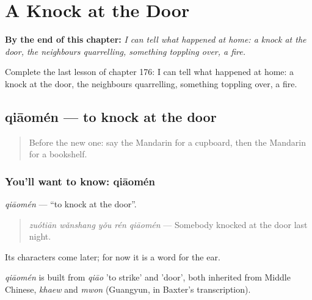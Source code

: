
\chapter{A Knock at the Door}
\label{ch:zh-a-knock-at-the-door}

\begin{chapteropening}
\textbf{By the end of this chapter:} \emph{I can tell what happened at home: a knock at the door, the neighbours quarrelling, something toppling over, a fire.}

Complete the last lesson of chapter 176: I can tell what happened at home: a knock at the door, the neighbours quarrelling, something toppling over, a fire.
\end{chapteropening}

\section[qiāomén]{qiāomén — to knock at the door}

\label{lesson:ZH-C176-qiaomen}



\begin{quote}
Before the new one: say the Mandarin for a cupboard, then the Mandarin for a bookshelf.
\end{quote}

\subsection*{You'll want to know: qiāomén}
\emph{qiāomén} — \textquotedblleft{}to knock at the door\textquotedblright{}.

\begin{quote}
\emph{zuótiān wǎnshang yǒu rén qiāomén} — Somebody knocked at the door last night.
\end{quote}

Its characters come later; for now it is a word for the ear.

\begin{cousinweb}
\emph{qiāomén} is built from \emph{qiāo} 'to strike' and  'door', both inherited from Middle Chinese, \emph{khaew} and \emph{mwon} (Guangyun, in Baxter's transcription).
\end{cousinweb}

